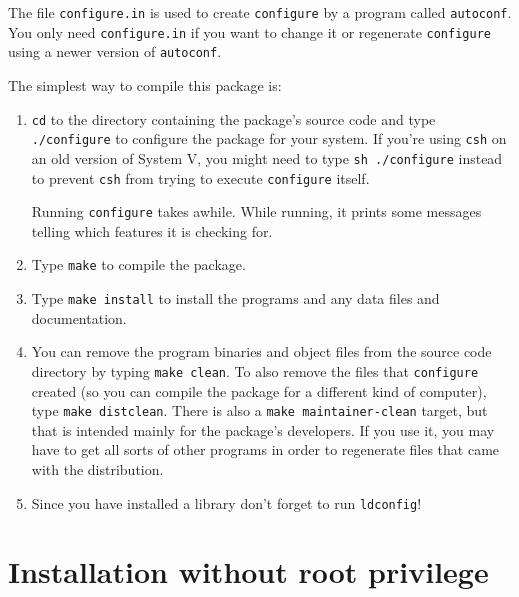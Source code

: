 \begin{appendix}
   The file \verb+configure.in+ is used to create \verb+configure+ by a program
called \verb+autoconf+.  You only need \verb+configure.in+ if you want to change
it or regenerate \verb+configure+ using a newer version of \verb+autoconf+.

The simplest way to compile this package is:
\begin{enumerate}
 \item \verb+cd+ to the directory containing the package's source code and type
     \verb+./configure+ to configure the package for your system.  If you're
     using \verb+csh+ on an old version of System V, you might need to type
     \verb+sh ./configure+ instead to prevent \verb+csh+ from trying to execute
     \verb+configure+ itself.

     Running \verb+configure+ takes awhile.  While running, it prints some
     messages telling which features it is checking for.
\item Type \verb+make+ to compile the package.

 \item Type \verb+make install+ to install the programs and any data files and
     documentation.

\item You can remove the program binaries and object files from the
     source code directory by typing \verb+make clean+.  To also remove the
     files that \verb+configure+ created (so you can compile the package for
     a different kind of computer), type \verb+make distclean+.  There is
     also a \verb+make maintainer-clean+ target, but that is intended mainly
     for the package's developers.  If you use it, you may have to get
     all sorts of other programs in order to regenerate files that came
     with the distribution.

\item Since you have installed a library don't forget to run \verb+ldconfig+!
\end{enumerate}
\section*{Installation without root privilege}



\end{appendix}

